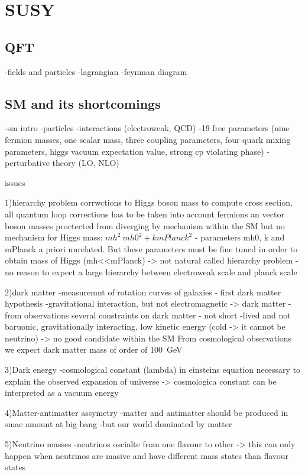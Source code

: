 \chapter{SUSY}

\section{QFT}

-fields and particles
-lagrangian
-feynman diagram


\section{SM and its shortcomings}

-sm intro
-particles
-interactions (electroweak, QCD)
-19 free parameters (nine fermion masses, one scalar mass, three coupling parameters, four quark mixing parameters, higgs vacuum expectation value, strong cp violating phase)
-perturbative theory (LO, NLO)

issues

1)hierarchy problem
corrwctions to Higgs boson mass
to compute cross section, all quantum loop corrections has to be taken into account
fermions an vector boson masses proctected from diverging by mechanism within the SM
but no mechanism for Higgs mass: $mh^2~ mh0^2+k mPlanck^2 $ - parameters mh0, k and mPlanck a priori unrelated. But these parameters must be fine tuned in order to obtain mass of Higgs (mh<<mPlanck) -> not natural
called hierarchy problem - no reason to expect a large hierarchy between electroweak scale and planck scale

2)dark matter
-measuremnt of rotation curves of galaxies - first dark matter hypothesis
-gravitational interaction, but not electromagnetic -> dark matter
-from observations several constraints on dark matter - not short -lived and not baruonic, gravitationally interacting, low kinetic energy (cold -> it cannot be neutrino)
-> no good candidate within the SM
From cosmological observations we expect dark matter mass of order of 100~GeV

3)Dark energy
-cosmological constant (lambda) in einsteins equation necessary to explain the observed expansion of universe
-> cosmologica constant can be interpreted as a vacuum energy

4)Matter-antimatter assymetry
-matter and antimatter should be produced in smae amount at big bang
-but our world dominated by matter

5)Neutrino masses
-neutrinos oscialte from one flavour to other -> this can only happen when neutrinos are masive and have different mass states than flavour states

